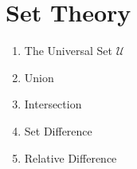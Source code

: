 \documentclass{article}
\begin{document}
\section{Set Theory}
\begin{enumerate}
\item The Universal Set $\mathcal{U}$
\item Union
\item Intersection
\item Set Difference
\item Relative Difference
\end{enumerate}
\end{document}
